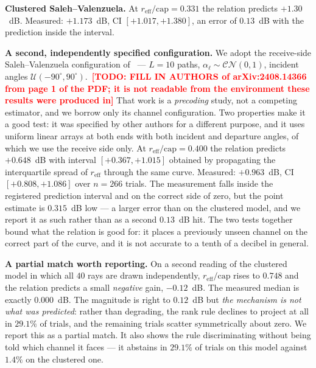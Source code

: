 \documentclass[journal]{IEEEtran}
\newcommand{\todo}[1]{\textcolor{red}{\textbf{[TODO: #1]}}}
\newcommand{\CN}{\mathcal{CN}}
\newcommand{\reff}{r_{\mathrm{eff}}}
\begin{document}
\textbf{Clustered Saleh--Valenzuela.} At $\reff/\mathrm{cap}=0.331$ the
relation predicts $+1.30$~dB. Measured:
$+1.173$~dB, CI $[+1.017,+1.380]$, an error of $0.13$~dB with the prediction
inside the interval.

\textbf{A second, independently specified configuration.} We adopt the
receive-side Saleh--Valenzuela configuration of~\cite{precoding2408} ---
$L=10$ paths, $\alpha_\ell\sim\CN(0,1)$, incident angles
$\mathcal{U}(-90^\circ,90^\circ)$.~\todo{FILL IN AUTHORS of arXiv:2408.14366
from page 1 of the PDF; it is not readable from the environment these results
were produced in} That work is a \emph{precoding} study, not a competing
estimator, and we borrow only its channel configuration. Two properties make
it a good test: it was specified by other authors for a different purpose, and
it uses uniform linear arrays at both ends with both incident and departure
angles, of which we use the receive side only. At
$\reff/\mathrm{cap}=0.400$ the relation predicts $+0.648$~dB with interval
$[+0.367,+1.015]$ obtained by propagating the interquartile spread of $\reff$
through the same curve. Measured:
$+0.963$~dB, CI $[+0.808,+1.086]$ over $n=266$ trials. The measurement falls
inside the registered prediction interval and on the correct side of zero, but
the point estimate is $0.315$~dB low --- a larger error than on the clustered
model, and we report it as such rather than as a second $0.13$~dB hit. The two
tests together bound what the relation is good for: it places a previously
unseen channel on the correct part of the curve, and it is not accurate to a
tenth of a decibel in general.

\textbf{A partial match worth reporting.} On a second reading of the clustered
model in which all $40$ rays are drawn independently, $\reff/\mathrm{cap}$
rises to $0.748$ and the relation predicts a small \emph{negative} gain,
$-0.12$~dB. The measured median is
exactly $0.000$~dB. The magnitude is right to $0.12$~dB but \emph{the
mechanism is not what was predicted}: rather than degrading, the rank rule
declines to project at all in $29.1\%$ of trials, and the remaining trials
scatter symmetrically about zero. We report this as a partial match. It also
shows the rule discriminating without being told which channel it faces --- it
abstains in $29.1\%$ of trials on this model against $1.4\%$ on the clustered
one.
\end{document}
